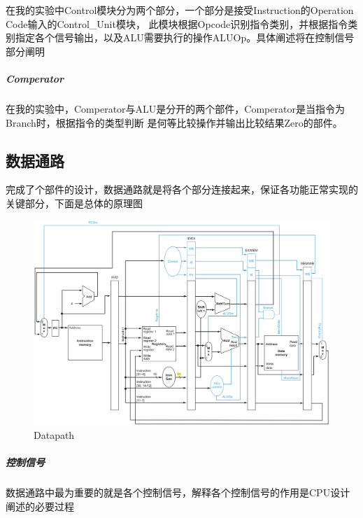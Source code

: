 在我的实验中Control模块分为两个部分，一个部分是接受Instruction的Operation Code输入的Control\_Unit模块，
此模块根据Opcode识别指令类别，并根据指令类别指定各个信号输出，以及ALU需要执行的操作ALUOp。具体阐述将在控制信号部分阐明

\subparagraph{Comperator}
在我的实验中，Comperator与ALU是分开的两个部件，Comperator是当指令为Branch时，根据指令的类型判断
是何等比较操作并输出比较结果Zero的部件。

\subsection{数据通路}
完成了个部件的设计，数据通路就是将各个部分连接起来，保证各功能正常实现的关键部分，下面是总体的原理图

\begin{figure}[H] %
    \centering %
    \includegraphics[width=1.0\textwidth]{slide5.jpg} %
    \caption{Datapath} %
    \label{Fig.6} %
\end{figure}

\subparagraph{控制信号}
数据通路中最为重要的就是各个控制信号，解释各个控制信号的作用是CPU设计阐述的必要过程 \\

